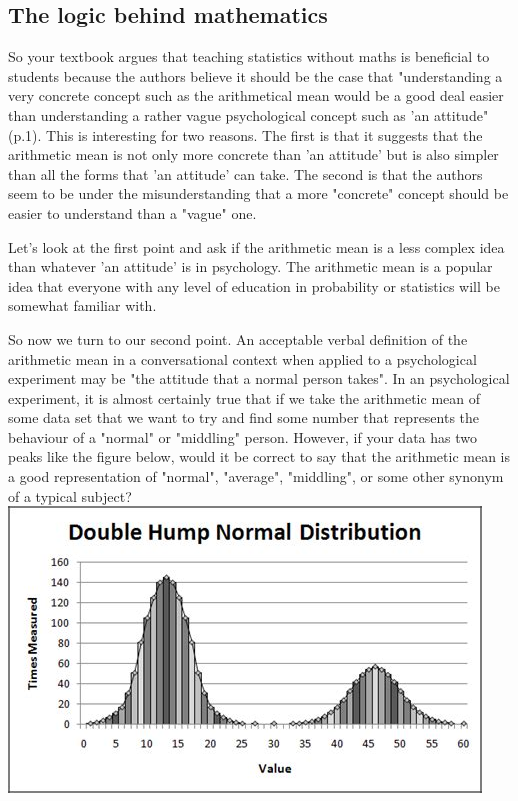\subsection{The logic behind mathematics}

So your textbook argues that teaching statistics without maths is beneficial to students because the authors believe it should be the case that "understanding a very concrete concept such as the arithmetical mean would be a good deal easier than understanding a rather vague psychological concept such as 'an attitude" (p.1). This is interesting for two reasons. The first is that it suggests that the arithmetic mean is not only more concrete than 'an attitude' but is also simpler than all the forms that 'an attitude' can take. The second is that the authors seem to be under the misunderstanding that a more "concrete" concept should be easier to understand than a "vague" one.

Let's look at the first point and ask if the arithmetic mean is a less complex idea than whatever 'an attitude' is in psychology. The arithmetic mean is a popular idea that everyone with any level of education in probability or statistics will be somewhat familiar with.

So now we turn to our second point. An acceptable verbal definition of the arithmetic mean in a conversational context when applied to a psychological experiment may be "the attitude that a normal person takes". In an psychological experiment, it is almost certainly true that if we take the arithmetic mean of some data set that we want to try and find some number that represents the behaviour of a "normal" or "middling" person. However, if your data has two peaks like the figure below, would it be correct to say that the arithmetic mean is a good representation of "normal", "average", "middling", or some other synonym of a typical subject? \\

\includegraphics[scale=.7]{images/double_hump.jpg} \\

